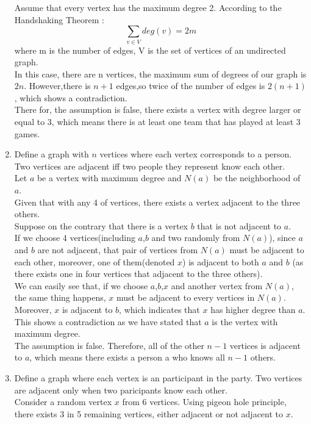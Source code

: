 \documentclass[a4paper]{article}
\begin{document}
\begin{enumerate}
		      Assume that every vertex has the maximum degree 2. According to the Handshaking Theorem :
		      \begin{equation*}
			      \sum_{v \in V} deg(v) = 2m
		      \end{equation*}
		      where m is the number of edges, V is the set of vertices of an undirected graph. \\
		      In this case, there are n vertices, the maximum sum of degrees of our graph is $2n$. However,there is $n+1$ edges,so twice of the number of edges is $2(n+1)$, which shows a contradiction. \\
		      There for, the assumption is false, there exists a vertex with degree larger or equal to 3, which means there is at least one team that has played at least 3 games.
		\item Define a graph with $n$ vertices where each vertex corresponds to a person. Two vertices are adjacent iff two people they represent know each other.\\
		      Let $a$ be a vertex with maximum degree and $N(a)$ be the neighborhood of $a$. \\
		      Given that with any 4 of vertices, there exists a vertex adjacent to the three others. \\
		      Suppose on the contrary that there is a vertex $b$ that is not adjacent to $a$. \\
		      If we choose 4 vertices(including $a$,$b$ and two randomly from $N(a)$), since $a$ and $b$ are not adjacent, that pair of vertices from $N(a)$ must be adjacent to each other, moreover, one of them(denoted $x$) is adjacent to both $a$ and $b$ (as there exists one in four vertices that adjacent to the three others). \\
		      We can easily see that, if we choose $a$,$b$,$x$ and another vertex from $N(a)$, the same thing happens, $x$ must be adjacent to every vertices in $N(a)$. Moreover, $x$ is adjacent to $b$, which indicates that $x$ has higher degree than $a$. This shows a contradiction as we have stated that $a$ is the vertex with maximum degree. \\
		      The assumption is false. Therefore, all of the other $n-1$ vertices is adjacent to $a$, which means there exists a person a who knows all $n-1$ others.
		\item Define a graph where each vertex is an participant in the party. Two vertices are adjacent only when two paricipants know each other. \\
		      Consider a random vertex $x$ from 6 vertices. Using pigeon hole principle, there exists 3 in 5 remaining vertices, either adjacent or not adjacent to $x$. \\

\end{enumerate}
\end{document}
